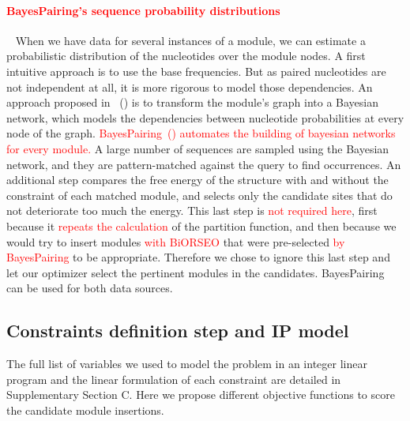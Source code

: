 \documentclass{bioinfo}
\begin{document}
\begin{methods}
\paragraph{\textcolor{red}{BayesPairing's sequence probability distributions}} ~ When we have data for several instances of a module, we can estimate a probabilistic distribution of the nucleotides over the module nodes. A first intuitive approach is to use the base frequencies. But as paired nucleotides are not independent at all, it is more rigorous to model those dependencies. An approach proposed in ~(\citealp{cruz2011sequence}) is to transform the module's graph into a Bayesian network, which models the dependencies between nucleotide probabilities at every node of the graph. 
\textcolor{red}{BayesPairing~(\citealp{sarrazin2019automated}) automates the building of bayesian networks for every module.}
A large number of sequences are sampled using the Bayesian network, and they are pattern-matched against the query to find occurrences. 
An additional step compares the free energy of the structure with and without the constraint of each matched module, and selects only the candidate sites that do not deteriorate too much the energy. 
This last step is \textcolor{red}{not required here}, first because it \textcolor{red}{repeats the calculation} of the partition function, and then because we would try to insert modules \textcolor{red}{with BiORSEO} that were pre-selected \textcolor{red}{by BayesPairing} to be appropriate. 
Therefore we chose to ignore this last step and let our optimizer select the pertinent modules in the candidates. BayesPairing can be used for both data sources.


\subsection{Constraints definition step and IP model} \label{sec:ip}
The full list of variables we used to model the problem in an integer linear program and the linear formulation of each constraint are detailed in Supplementary Section C. Here we propose different objective functions to score the candidate module insertions. %


\end{methods}
\end{document}
